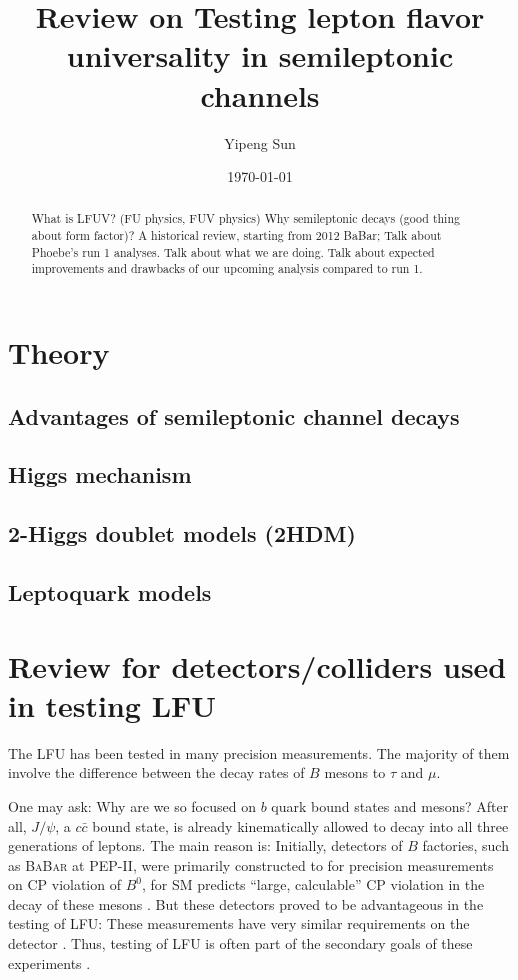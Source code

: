 \documentclass[12pt,letterpaper]{article}
\title{Review on Testing lepton flavor universality in semileptonic channels}
\author{Yipeng Sun}
\affil{Department of Physics, University of Maryland}
\date{\today}
\def\BaBar/{\textsc{BaBar}}
\begin{document}
\maketitle

\begin{abstract}
    What is LFUV? (FU physics, FUV physics)
    Why semileptonic decays (good thing about form factor)?
    A historical review, starting from 2012 BaBar;
    Talk about Phoebe's run 1 analyses.
    Talk about what we are doing.
    Talk about expected improvements and drawbacks of our upcoming analysis compared
    to run 1.
\end{abstract}

\section{Theory}



\subsection{Advantages of semileptonic channel decays}

\subsection{Higgs mechanism}

\subsection{2-Higgs doublet models (2HDM)}

\subsection{Leptoquark models}


\section{Review for detectors/colliders used in testing LFU}
The LFU has been tested in many precision measurements.
The majority of them involve the difference between the decay rates of $B$
mesons to $\tau$ and $\mu$.

One may ask: Why are we so focused on $b$ quark bound states and mesons?
After all, $J/\psi$, a $c\bar{c}$ bound state, is already kinematically allowed
to decay into all three generations of leptons.
The main reason is:
Initially, detectors of $B$ factories, such as \BaBar/ at PEP-II, were
primarily constructed to for precision measurements on CP violation of $B^0$,
for SM predicts ``large, calculable'' CP violation in the decay of these mesons
\cite{Luth:1994}.
But these detectors proved to be advantageous in the testing of LFU:
These measurements have very similar requirements on the
detector \cite{Boutigny:1995ib}.
Thus, testing of LFU is often part of the secondary goals of these
experiments \cite{Luth:1994}.
\end{document}
